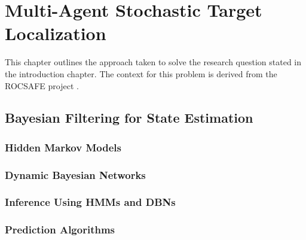 \chapter{Multi-Agent Stochastic Target Localization}
\placeholder{}
This chapter outlines the approach taken to solve the research question stated in the introduction chapter. The context for this problem is derived from the ROCSAFE project \cite{rocsafeNUIG}. 

\section{Bayesian Filtering for State Estimation}

\subsection{Hidden Markov Models}

\label{Chapter:HMM}

\subsection{Dynamic Bayesian Networks}

\label{Chapter:DBN}

\subsection{Inference Using HMMs and DBNs}\label{subsection:InferenceHMMDBN}


\subsection{Prediction Algorithms}





